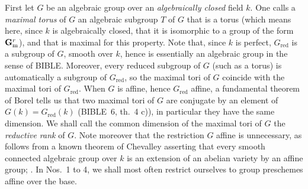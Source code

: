First let $G$ be an algebraic group over an \emph{algebraically closed} field $k$. One calls a \emph{maximal torus} of $G$ an algebraic subgroup $T$ of $G$ that is a torus (which means here, since $k$ is algebraically closed, that it is isomorphic to a group of the form $\mathbf{G}_{\mathrm{m}}^r$), and that is maximal for this property. Note that, since $k$ is perfect, $G_{\mathrm{red}}$ is a subgroup of $G$, smooth over $k$, hence is essentially an algebraic group in the sense of BIBLE. Moreover, every reduced subgroup of $G$ (such as a torus) is automatically a subgroup of $G_{\mathrm{red}}$, so the maximal tori of $G$ coincide with the maximal tori of $G_{\mathrm{red}}$. When $G$ is affine, hence $G_{\mathrm{red}}$ affine, a fundamental theorem of Borel tells us that two maximal tori of $G$ are conjugate by an element of $G(k)=G_{\mathrm{red}}(k)$ (BIBLE~6, th.~4 c)), in particular they have the same dimension. We shall call the common dimension of the maximal tori of $G$ the \emph{reductive rank} of $G$. Note moreover that the restriction $G$ affine is unnecessary, as follows from a known theorem of Chevalley asserting that every smooth connected algebraic group over $k$ is an extension of an abelian variety by an affine group; \cf {}. In Nos.~1 to 4, we shall most often restrict ourselves to group preschemes affine over the base.

